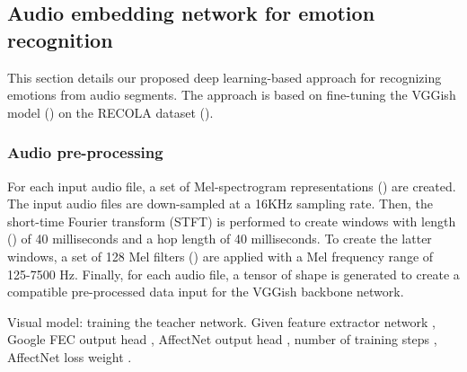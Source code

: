 \documentclass[times,twocolumn,final,authoryear]{elsarticle}
\begin{document}
	\subsection{Audio embedding network for emotion recognition}
	
	This section details our proposed deep learning-based approach for recognizing emotions from audio segments. The approach is based on fine-tuning the VGGish model (\cite{Vggish2017}) on the RECOLA dataset (\cite{recola}).
	
	\subsubsection{Audio pre-processing}
	\label{sec:audiopreproc}
	
	For each input audio file, a set of Mel-spectrogram representations () are created. The input audio files are down-sampled at a 16KHz sampling rate. Then, the short-time Fourier transform (STFT) is performed to create windows with length () of 40 milliseconds and a hop length of 40 milliseconds. To create the latter windows, a set of 128 Mel filters () are applied with a Mel frequency range of 125-7500 Hz. Finally, for each audio file, a tensor of shape  is generated to create a compatible pre-processed data input for the VGGish backbone network. 
	
	\begin{algorithm2e}
		
		\SetAlgoLined
		\caption{Visual model: training the teacher network. Given feature extractor network , Google FEC output head , AffectNet output head ,  number of training steps , AffectNet loss weight .}
		\label{algo1}
	\end{algorithm2e}
	
\end{document}
